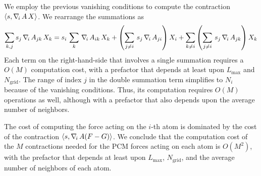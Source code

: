 We employ the previous vanishing conditions to compute the contraction $\langle s , \nabla_{\!i}\, A\,X \rangle$. We rearrange the summations as
\[
	\sum_{k,j} s_j \, \nabla_{\!i}\, A_{jk} \, X_k 
	=  s_i \, \sum_k \, \nabla_{\!i}\, A_{ik} \, X_k 
	+ \left(\sum_{j \not=i} \, s_j \, \nabla_{\!i}\, A_{ji}  \right) X_i 
	+ \sum_{k\not=i}  \left(\sum_{j\not=i} \, s_j \, \nabla_{\!i}\, A_{jk}\right) X_k
\]
Each term on the right-hand-side that involves a single summation requires a $O(M)$ computation cost, with a prefactor that depends at least upon $L_\text{max}$ and $N_\text{grid}$. The range of index $j$ in the double summation term simplifies to $N_i$ because of the vanishing conditions. Thus, its computation requires $O(M)$ operations as well, although with a prefactor that also depends upon the average number of neighbors.

The cost of computing the force acting on the $i$-th atom is dominated by the cost of the contraction $\langle s , \nabla_{\!i}\,  A ( F - G ) \rangle$. We conclude that the computation cost of the $M$ contractions needed for the PCM forces acting on each atom is $O(M^2)$, with the prefactor that depends at least upon $L_\text{max}$, $N_\text{grid}$, and the average number of neighbors of each atom.


%
